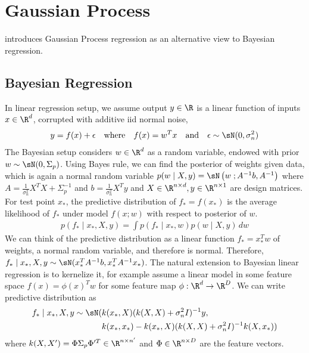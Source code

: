 \documentclass[11pt]{article}
\begin{document}
 
\section{Gaussian Process}

\cite{carledwardrasmussenGaussianProcessMachine2006} introduces Gaussian Process regression as an alternative view to Bayesian regression. 

\subsection{Bayesian Regression}
 
In linear regression setup, we assume output $y\in\R$ is a linear function of inputs $x\in\R^d$, corrupted with additive iid normal noise,
\begin{align}
    y = f(x) + \epsilon
    \quad\text{where}\quad
    f(x) = w^Tx
    \quad\text{and}\quad
    \epsilon \sim \sN(0, \sigma_n^2)
\end{align}
The Bayesian setup considers $w\in\R^d$ as a random variable, endowed with prior $w\sim \sN(0,\Sigma_p)$. Using Bayes rule, we can find the posterior of weights given data, which is again a normal random variable $p(w \mid X, y) = \sN\left(w \; ; A^{-1}b, A^{-1} \right)$ where $A=\frac{1}{\sigma_n^2} X^TX + \Sigma_p^{-1}$ and $b = \frac{1}{\sigma_n^2}X^Ty$ and $X\in\R^{n\times d}, y\in\R^{n\times 1}$ are design matrices. For test point $x_*$, the predictive distribution of $f_*=f(x_*)$ is the average likelihood of $f_*$ under model $f(x;w)$ with respect to posterior of $w$.
\begin{align}
    p(f_*\mid x_*, X, y)
        = \int p(f_*\mid x_*,w) p(w\mid X, y) \, dw
    \label{eq:kernel_bayesian_regression_predictive_distribution_integral}
\end{align}
We can think of the predictive distribution as a linear function $f_* = x_*^Tw$ of weights, a normal random variable, and therefore is normal. Therefore, $f_*\mid x_*,X,y \sim \sN( x_*^T A^{-1}b, x_*^T A^{-1}x_* )$. The natural extension to Bayesian linear regression is to kernelize it, for example assume a linear model in some feature space $f(x) = \phi(x)^Tw$ for some feature map $\phi:\R^d\to\R^D$. We can write predictive distribution as 
\begin{align}
    f_* \mid x_*,X,y \sim \sN(
        & k(x_*,X) (k(X,X)+\sigma_n^2 I)^{-1}y, \\
        & k(x_*,x_*) - k(x_*,X)(k(X,X) + \sigma_n^2 I)^{-1} k(X,x_*))
    \label{eq:kernel_bayesian_regression_predictive_distribution}
\end{align}
where $k(X,X') = \Phi \Sigma_p \Phi'^T \in \R^{n\times n'}$ and $\Phi\in\R^{n\times D}$ are the feature vectors.
\end{document}
